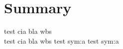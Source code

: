 \section*{Summary}\label{cha:summary}
test \gls{cia} bla \gls{wbs} \\ test \gls{cia} bla \gls{wbs}
test \gls{sym:a} test \gls{sym:a}
